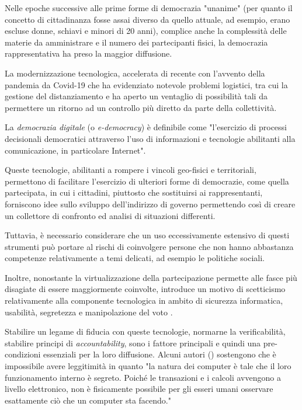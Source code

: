 \documentclass[12pt,a4paper,openright,twoside]{book}
\begin{document}
Nelle epoche successive alle prime forme di democrazia "unanime" (per quanto il concetto di cittadinanza fosse assai diverso da quello attuale,
ad esempio, erano escluse donne, schiavi e minori di 20 anni), complice anche la complessità
delle materie da amministrare e il numero dei partecipanti fisici, la democrazia
rappresentativa ha preso la maggior diffusione. 

La modernizzazione tecnologica, accelerata di recente con l'avvento della pandemia da Covid-19 che ha evidenziato notevole problemi
logistici, tra cui la gestione del distanziamento \cite{sotoacosta} e ha aperto un ventaglio di possibilità tali da
permettere un ritorno ad un controllo più diretto da parte della collettività.

La \textit{democrazia digitale} (o \textit{e-democracy}) è definibile come "l'esercizio di processi decisionali democratici attraverso 
l'uso di informazioni e tecnologie abilitanti alla comunicazione, in particolare Internet"\cite{rotzocki}.

Queste tecnologie, abilitanti a rompere i vincoli geo-fisici e territoriali,
permettono di facilitare l'esercizio di ulteriori forme di democrazie,
come quella partecipata, in cui i cittadini, piuttosto che
sostituirsi ai rappresentanti, forniscono idee sullo sviluppo dell'indirizzo di governo
permettendo così di creare un collettore di confronto ed analisi di situazioni differenti.

Tuttavia, è necessario considerare che un uso eccessivamente estensivo di questi strumenti
può portare al rischi di coinvolgere persone che non hanno abbastanza competenze relativamente 
a temi delicati, ad esempio le politiche sociali. 

Inoltre, nonostante la virtualizzazione della partecipazione permette alle fasce più disagiate di essere
maggiormente coinvolte, introduce un motivo di scetticismo relativamente alla componente tecnologica
in ambito di sicurezza informatica, usabilità, segretezza e manipolazione del voto \cite{aichholzer2020experience}.

Stabilire un legame di fiducia con queste tecnologie, normarne la verificabilità, stabilire principi di 
\textit{accountability}, sono i fattore principali e quindi una pre-condizioni essenziali
per la loro diffusione. 
Alcuni autori (\cite{mcgaley}) sostengono che è impossibile avere leggitimità in quanto "la natura dei computer è tale che il loro funzionamento interno è segreto.
Poiché le transazioni e i calcoli avvengono a livello elettronico, 
non è fisicamente possibile per gli esseri umani osservare esattamente ciò che un computer sta facendo."
\end{document}
